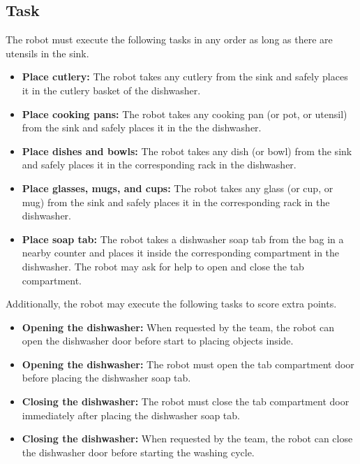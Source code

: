 \subsection{Task}
The robot must execute the following tasks in any order as long as there are utensils in the sink.
\begin{itemize}
	\item \textbf{Place cutlery:} The robot takes any cutlery from the sink and safely places it in the cutlery basket of the dishwasher.

	\item \textbf{Place cooking pans:} The robot takes any cooking pan (or pot, or utensil) from the sink and safely places it in the the dishwasher.

	\item \textbf{Place dishes and bowls:} The robot takes any dish (or bowl) from the sink and safely places it in the corresponding rack in the dishwasher.

	\item \textbf{Place glasses, mugs, and cups:} The robot takes any glass (or cup, or mug) from the sink and safely places it in the corresponding rack in the dishwasher.

	\item \textbf{Place soap tab:} The robot takes a dishwasher soap tab from the bag in a nearby counter and places it inside the corresponding compartment in the dishwasher. The robot may ask for help to open and close the tab compartment.
\end{itemize}

Additionally, the robot may execute the following tasks to score extra points.
\begin{itemize}
	\item \textbf{Opening the dishwasher:} When requested by the team, the robot can open the dishwasher door before start to placing objects inside.

	\item \textbf{Opening the dishwasher:} The robot must open the tab compartment door before placing the dishwasher soap tab.

	\item \textbf{Closing the dishwasher:} The robot must close the tab compartment door immediately after placing the dishwasher soap tab.

	\item \textbf{Closing the dishwasher:} When requested by the team, the robot can close the dishwasher door before starting the washing cycle.
\end{itemize}


